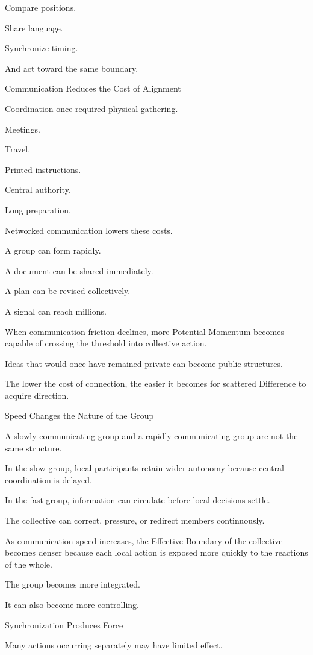 Compare positions.

Share language.

Synchronize timing.

And act toward the same boundary.

Communication Reduces the Cost of Alignment

Coordination once required physical gathering.

Meetings.

Travel.

Printed instructions.

Central authority.

Long preparation.

Networked communication lowers these costs.

A group can form rapidly.

A document can be shared immediately.

A plan can be revised collectively.

A signal can reach millions.

When communication friction declines, more Potential Momentum becomes capable of crossing the threshold into collective action.

Ideas that would once have remained private can become public structures.

The lower the cost of connection, the easier it becomes for scattered Difference to acquire direction.

Speed Changes the Nature of the Group

A slowly communicating group and a rapidly communicating group are not the same structure.

In the slow group, local participants retain wider autonomy because central coordination is delayed.

In the fast group, information can circulate before local decisions settle.

The collective can correct, pressure, or redirect members continuously.

As communication speed increases, the Effective Boundary of the collective becomes denser because each local action is exposed more quickly to the reactions of the whole.

The group becomes more integrated.

It can also become more controlling.

Synchronization Produces Force

Many actions occurring separately may have limited effect.

